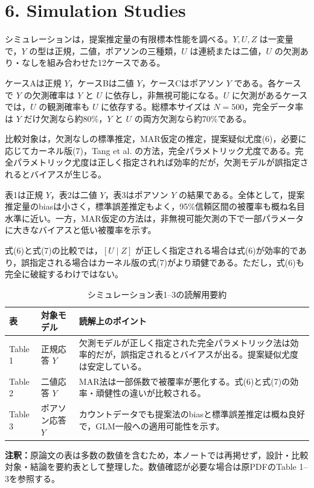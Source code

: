 \documentclass[dvipdfmx,autodetect-engine]{jsarticle}
\newcommand{\note}[1]{\par\smallskip\noindent\textbf{注釈：}#1\par\smallskip}
\begin{document}
\section{6. Simulation Studies}

シミュレーションは，提案推定量の有限標本性能を調べる。$Y,U,Z$ は一変量で，$Y$ の型は正規，二値，ポアソンの三種類，$U$ は連続または二値，$U$ の欠測あり・なしを組み合わせた12ケースである。

ケースAは正規 $Y$，ケースBは二値 $Y$，ケースCはポアソン $Y$ である。各ケースで $Y$ の欠測確率は $Y$ と $U$ に依存し，非無視可能になる。$U$ に欠測があるケースでは，$U$ の観測確率も $U$ に依存する。総標本サイズは $N=500$，完全データ率は $Y$ だけ欠測なら約80\%，$Y$ と $U$ の両方欠測なら約70\%である。

比較対象は，欠測なしの標準推定，MAR仮定の推定，提案疑似尤度(6)，必要に応じてカーネル版(7)，Tang et al. の方法，完全パラメトリック尤度である。完全パラメトリック尤度は正しく指定されれば効率的だが，欠測モデルが誤指定されるとバイアスが生じる。

表1は正規 $Y$，表2は二値 $Y$，表3はポアソン $Y$ の結果である。全体として，提案推定量のbiasは小さく，標準誤差推定もよく，95\%信頼区間の被覆率も概ね名目水準に近い。一方，MAR仮定の方法は，非無視可能欠測の下で一部パラメータに大きなバイアスと低い被覆率を示す。

式(6)と式(7)の比較では，$[U\mid Z]$ が正しく指定される場合は式(6)が効率的であり，誤指定される場合はカーネル版の式(7)がより頑健である。ただし，式(6)も完全に破綻するわけではない。

\begin{table}[tbp]
\centering
\caption{シミュレーション表1--3の読解用要約}
\begin{tabular}{p{.16\linewidth}p{.29\linewidth}p{.45\linewidth}}
\hline
表 & 対象モデル & 読解上のポイント \\
\hline
Table 1 & 正規応答 $Y$ & 欠測モデルが正しく指定された完全パラメトリック法は効率的だが，誤指定されるとバイアスが出る。提案疑似尤度は安定している。\\
Table 2 & 二値応答 $Y$ & MAR法は一部係数で被覆率が悪化する。式(6)と式(7)の効率・頑健性の違いが比較される。\\
Table 3 & ポアソン応答 $Y$ & カウントデータでも提案法のbiasと標準誤差推定は概ね良好で，GLM一般への適用可能性を示す。\\
\hline
\end{tabular}
\end{table}

\note{原論文の表は多数の数値を含むため，本ノートでは再掲せず，設計・比較対象・結論を要約表として整理した。数値確認が必要な場合は原PDFのTable 1--3を参照する。}
\end{document}
